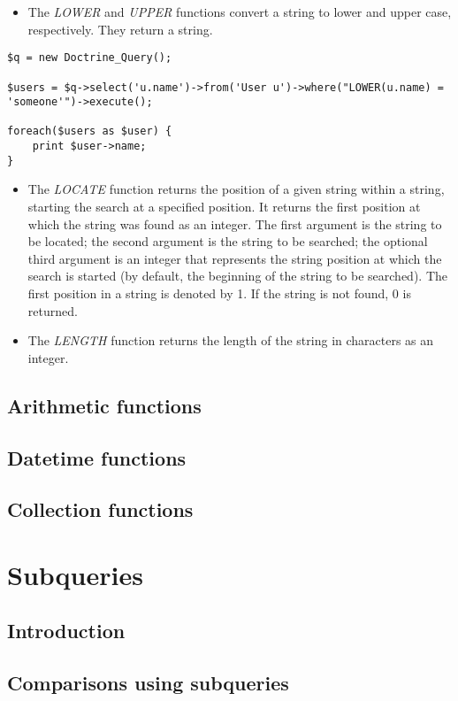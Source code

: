 \documentclass[11pt,a4paper]{report}
\begin{document}
\begin{itemize}
\item{The \textsl{LOWER} and \textsl{UPPER} functions convert a string to lower and upper case, respectively. They return a string.}
\end{itemize}
\begin{verbatim}
$q = new Doctrine_Query();

$users = $q->select('u.name')->from('User u')->where("LOWER(u.name) = 'someone'")->execute();

foreach($users as $user) {
    print $user->name;
}
\end{verbatim}

\begin{itemize}
\item{The \textsl{LOCATE} function returns the position of a given string within a string, starting the search at a specified position. It returns the first position at which the string was found as an integer. The first argument is the string to be located; the second argument is the string to be searched; the optional third argument is an integer that represents the string position at which the search is started (by default, the beginning of the string to be searched). The first position in a string is denoted by 1. If the string is not found, 0 is returned.}
\item{The \textsl{LENGTH} function returns the length of the string in characters as an integer.}
\end{itemize}
\subsection{Arithmetic functions}
\subsection{Datetime functions}
\subsection{Collection functions}
\section{Subqueries}
\subsection{Introduction}
\subsection{Comparisons using subqueries}
\end{document}

